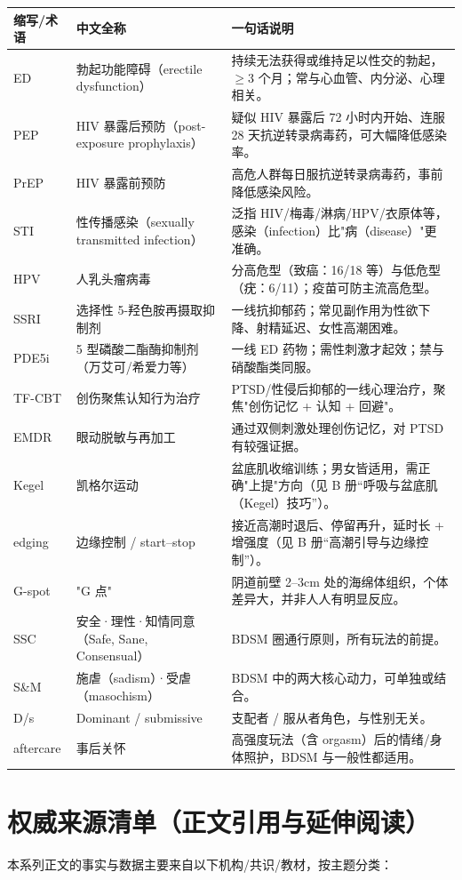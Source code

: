 \begin{tabularx}{\textwidth}{l X X}
\toprule
\textbf{缩写/术语} & \textbf{中文全称} & \textbf{一句话说明} \\
\midrule
ED & 勃起功能障碍（erectile dysfunction） & 持续无法获得或维持足以性交的勃起，$\ge$3 个月；常与心血管、内分泌、心理相关。 \\
PEP & HIV 暴露后预防（post-exposure prophylaxis） & 疑似 HIV 暴露后 72 小时内开始、连服 28 天抗逆转录病毒药，可大幅降低感染率。 \\
PrEP & HIV 暴露前预防 & 高危人群每日服抗逆转录病毒药，事前降低感染风险。 \\
STI & 性传播感染（sexually transmitted infection） & 泛指 HIV/梅毒/淋病/HPV/衣原体等，感染（infection）比"病（disease）"更准确。 \\
HPV & 人乳头瘤病毒 & 分高危型（致癌：16/18 等）与低危型（疣：6/11）；疫苗可防主流高危型。 \\
SSRI & 选择性 5-羟色胺再摄取抑制剂 & 一线抗抑郁药；常见副作用为性欲下降、射精延迟、女性高潮困难。 \\
PDE5i & 5 型磷酸二酯酶抑制剂（万艾可/希爱力等） & 一线 ED 药物；需性刺激才起效；禁与硝酸酯类同服。 \\
TF-CBT & 创伤聚焦认知行为治疗 & PTSD/性侵后抑郁的一线心理治疗，聚焦"创伤记忆 + 认知 + 回避"。 \\
EMDR & 眼动脱敏与再加工 & 通过双侧刺激处理创伤记忆，对 PTSD 有较强证据。 \\
Kegel & 凯格尔运动 & 盆底肌收缩训练；男女皆适用，需正确"上提"方向（见 B 册“呼吸与盆底肌（Kegel）技巧”）。 \\
edging & 边缘控制 / start--stop & 接近高潮时退后、停留再升，延时长 + 增强度（见 B 册“高潮引导与边缘控制”）。 \\
G-spot & "G 点" & 阴道前壁 2--3cm 处的海绵体组织，个体差异大，并非人人有明显反应。 \\
SSC & 安全·理性·知情同意（Safe, Sane, Consensual） & BDSM 圈通行原则，所有玩法的前提。 \\
S\&M & 施虐（sadism）·受虐（masochism） & BDSM 中的两大核心动力，可单独或结合。 \\
D/s & Dominant / submissive & 支配者 / 服从者角色，与性别无关。 \\
aftercare & 事后关怀 & 高强度玩法（含 orgasm）后的情绪/身体照护，BDSM 与一般性都适用。 \\
\bottomrule
\end{tabularx}

\section{权威来源清单（正文引用与延伸阅读）}
本系列正文的事实与数据主要来自以下机构/共识/教材，按主题分类：


